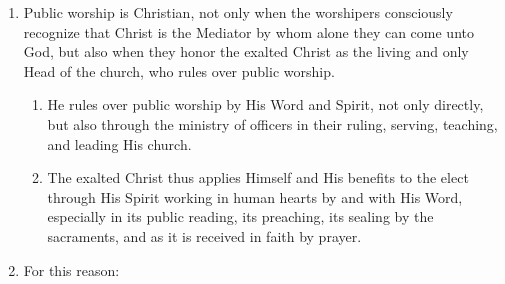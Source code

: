 \documentclass[
]{book}
\providecommand{\tightlist}{%
  \setlength{\itemsep}{0pt}\setlength{\parskip}{0pt}}
\begin{document}
\begin{enumerate}
\def\labelenumi{\arabic{enumi}.}
\tightlist
\item
  \protect\hypertarget{53}{\href{}{}}Public worship is Christian, not only when the worshipers consciously recognize that Christ is the Mediator by whom alone they can come unto God, but also when they honor the exalted Christ as the living and only Head of the church, who rules over public worship.

  \begin{enumerate}
  \def\labelenumii{\alph{enumii}.}
  \tightlist
  \item
    He rules over public worship by His Word and Spirit, not only directly, but also through the ministry of officers in their ruling, serving, teaching, and leading His church.
  \item
    The exalted Christ thus applies Himself and His benefits to the elect through His Spirit working in human hearts by and with His Word, especially in its public reading, its preaching, its sealing by the sacraments, and as it is received in faith by prayer.
  \end{enumerate}
\item
  For this reason:


\end{enumerate}
\end{document}

